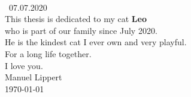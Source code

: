 \NewPage
\thispagestyle{empty}

\begin{center}
    \vspace*{3cm}
    \vspace{2cm}\\
    \gtrsymBorn~07.07.2020\\
    \bigskip
    This thesis is dedicated to my cat \textbf{Leo}\\ who is part of our family since July 2020.\\ He is the kindest cat I ever own and very playful.\\For a long life together.\\ 
    \bigskip
    I love you.\\
    \bigskip
    Manuel Lippert\\
    \today
\end{center}